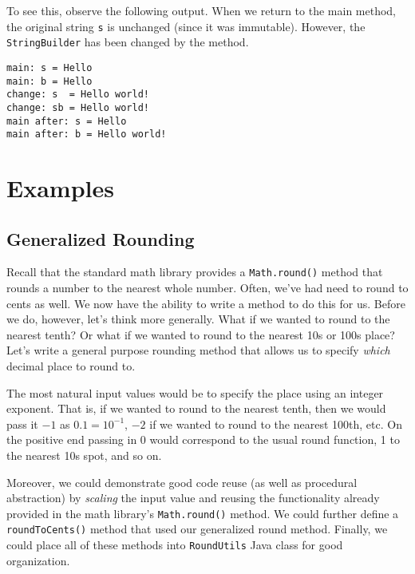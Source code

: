 To see this, observe the following output.  When we
return to the main method, the original string \texttt{s}
is unchanged (since it was immutable).  However, the
\texttt{StringBuilder} has been changed by
the method.


\begin{verbatim}
main: s = Hello
main: b = Hello
change: s  = Hello world!
change: sb = Hello world!
main after: s = Hello
main after: b = Hello world!
\end{verbatim}

\section{Examples}

\subsection{Generalized Rounding}

Recall that the standard math library provides a 
\texttt{Math.round()} method that rounds a number to 
the nearest whole number.  Often, we've had need to round to 
cents as well.  We now have the ability to write a method to do 
this for us.  Before we do, however, let's think more generally.  
What if we wanted to round to the nearest tenth?  Or
what if we wanted to round to the nearest 10s or 100s place?  Let's
write a general purpose rounding method that allows us to specify
\emph{which} decimal place to round to.  

The most natural input values would be to specify the place using
an integer exponent.  That is, if we wanted to round to the nearest
tenth, then we would pass it $-1$ as $0.1 = 10^{-1}$, $-2$ if we wanted
to round to the nearest 100th, etc.  On the positive end passing in 0
would correspond to the usual round function, 1 to the nearest 10s spot, 
and so on.  

Moreover, we could demonstrate good code reuse (as well as procedural
abstraction) by \emph{scaling} the input value and reusing the functionality
already provided in the math library's \texttt{Math.round()} 
method.  We could further define a \texttt{roundToCents()} 
method that used our generalized round method.  Finally, we could place
all of these methods into \texttt{RoundUtils} Java class for
good organization.

